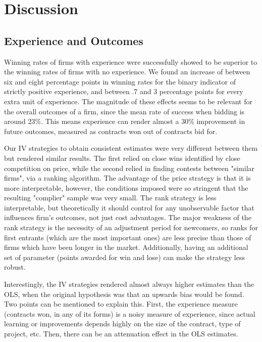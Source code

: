 \chapter{Discussion}

\section{Experience and Outcomes}
Winning rates of firms with experience were successfully showed to be superior to the winning rates  of firms with no experience. We found an increase of between six and eight percentage points in winning rates for the binary indicator of strictly positive experience, and between .7 and 3 percentage points for every extra unit of experience. The magnitude of these effects seems to be relevant for the overall outcomes of a firm, since the mean rate of success when bidding is around 23\%. This means experience can render almost a 30\% improvement in future outcomes, measured as contracts won out of contracts bid for.

Our IV strategies to obtain consistent estimates were very different between them but rendered similar results. The first relied on close wins identified by close competition on price, while the second relied in finding contests between "similar firms", via a ranking algorithm. The advantage of the price strategy is that it is more interpretable, however, the conditions imposed were so stringent that the resulting "complier" sample was very small. The rank strategy is less interpretable, but theoretically it should control for any unobservable factor that influences firm's outcomes, not just cost advantages. The major weakness of the rank strategy is the necessity of an adjustment period for newcomers, so ranks for first entrants (which are the most important ones) are less precise than those of firms which have been longer in the market. Additionally, having an additional set of parameter (points awarded for win and lose) can make the strategy less  robust.

Interestingly, the IV strategies rendered almost always higher estimates than the OLS, when the original hypothesis was that an upwards bias would be found. Two points can be mentioned to explain this. First, the experience measure (contracts won, in any of its forms) is a noisy measure of experience, since actual learning or improvements depends highly on the size of the contract, type of project, etc. Then, there can be an attenuation effect in the OLS estimates.

